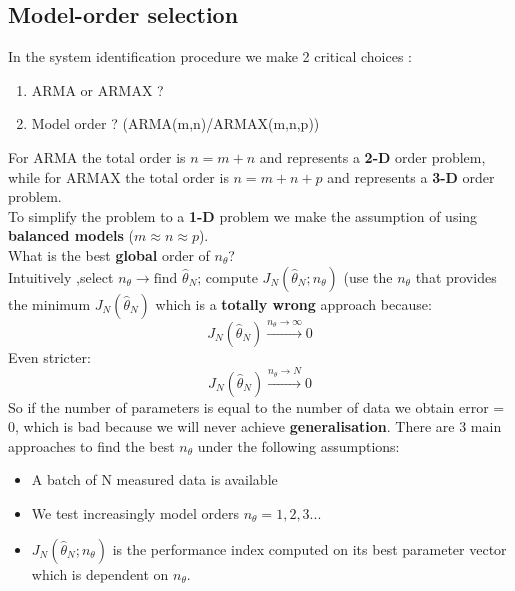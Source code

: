 \subsection{Model-order selection}
In the system identification procedure we make 2 critical choices : 
\begin{enumerate}
\item ARMA or ARMAX ?
\item Model order ? (ARMA(m,n)/ARMAX(m,n,p))
\end{enumerate}
For ARMA the total order is $n= m+n$ and represents a \textbf{2-D} order problem, while for ARMAX the total order is $n=m+n+p$ and represents a \textbf{3-D} order problem.\\
To simplify the problem to a \textbf{1-D} problem we make the assumption of using \textbf{balanced models} ($m \approx n \approx p$).\\
What is the best \textbf{global} order of $n_{\theta}$?\\
Intuitively ,select $n_{\theta} \to \text{find  } \hat{\theta}_N \text{; compute  } J_N(\hat{\theta}_N; n_{\theta})$ (use the $n_{\theta}$ that provides the minimum $J_N(\hat{\theta}_N)$
which is a \textbf{totally wrong} approach because:
$$ J_N(\hat{\theta}_N) \xrightarrow[]{n_{\theta} \to \infty} 0$$
Even stricter:
$$ J_N(\hat{\theta}_N) \xrightarrow[]{n_{\theta} \to N} 0$$
So if the number of parameters is equal to the number of data we obtain error = 0, which is bad because we will never achieve \textbf{generalisation}.
There are 3 main approaches to find the best $n_{\theta}$ under the following assumptions:
\begin{itemize}
\item A batch of N measured data is available
\item We test increasingly model orders $n_{\theta}=1,2,3...$
\item $J_N(\hat{\theta}_N;n_{\theta})$ is the performance index computed on its best parameter vector which is dependent on $n_{\theta}$.
\end{itemize}

